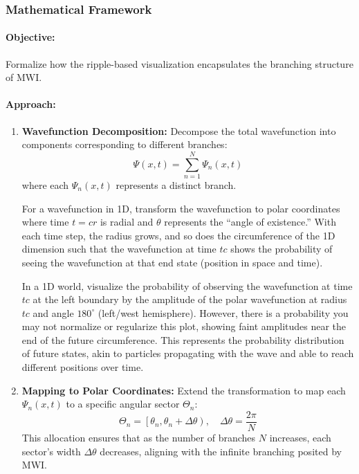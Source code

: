 \documentclass[12pt]{article}
\begin{document}
\subsubsection{Mathematical Framework}
\paragraph{Objective:} Formalize how the ripple-based visualization encapsulates the branching structure of MWI.

\paragraph{Approach:}
\begin{enumerate}
    \item \textbf{Wavefunction Decomposition:}
    Decompose the total wavefunction into components corresponding to different branches:
    \[
    \Psi(x,t) = \sum_{n=1}^{N} \Psi_n(x,t)
    \]
    where each \(\Psi_n(x,t)\) represents a distinct branch.
    
    For a wavefunction in 1D, transform the wavefunction to polar coordinates where time \(t = cr\) is radial and \(\theta\) represents the “angle of existence.” With each time step, the radius grows, and so does the circumference of the 1D dimension such that the wavefunction at time \(tc\) shows the probability of seeing the wavefunction at that end state (position in space and time).
    
    In a 1D world, visualize the probability of observing the wavefunction at time \(tc\) at the left boundary by the amplitude of the polar wavefunction at radius \(tc\) and angle \(180^\circ\) (left/west hemisphere). However, there is a probability you may not normalize or regularize this plot, showing faint amplitudes near the end of the future circumference. This represents the probability distribution of future states, akin to particles propagating with the wave and able to reach different positions over time.
    
    \item \textbf{Mapping to Polar Coordinates:}
    Extend the transformation to map each \(\Psi_n(x,t)\) to a specific angular sector \(\Theta_n\):
    \[
    \Theta_n = \left[\theta_n, \theta_n + \Delta\theta\right), \quad \Delta\theta = \frac{2\pi}{N}
    \]
    This allocation ensures that as the number of branches \(N\) increases, each sector's width \(\Delta\theta\) decreases, aligning with the infinite branching posited by MWI.
\end{enumerate}
\end{document}
